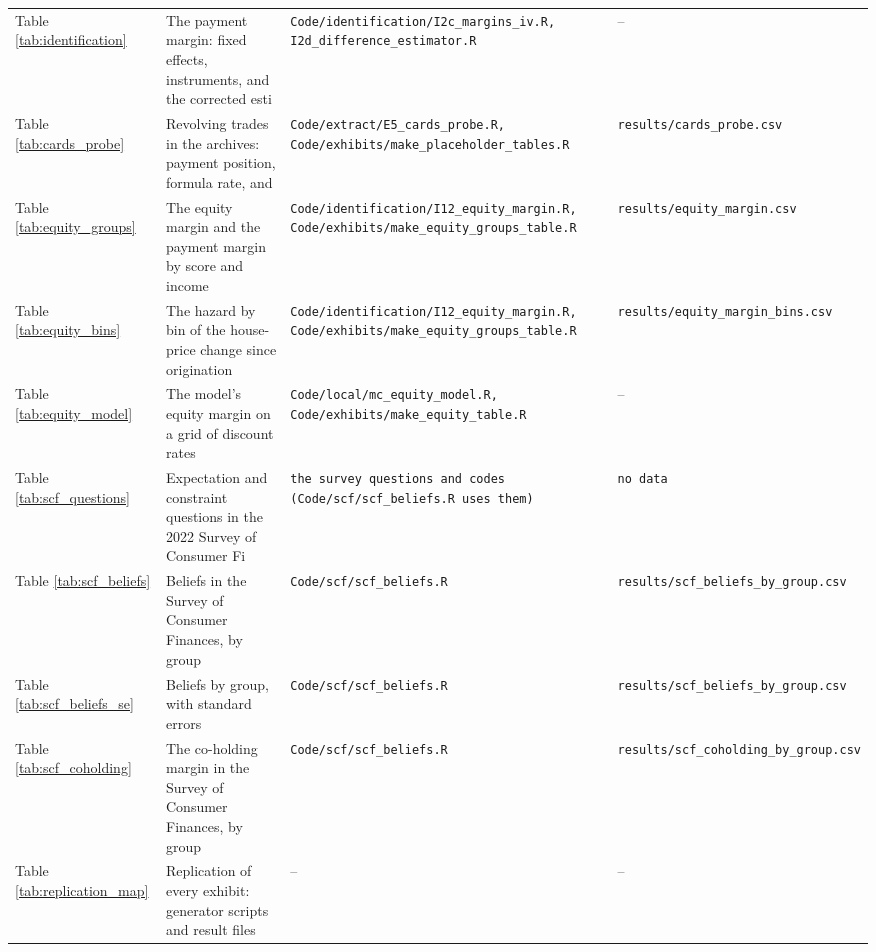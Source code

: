 \begin{longtable}{@{}p{}p{}p{}p{}@{}}
Table \ref{tab:identification} & The payment margin: fixed effects, instruments, and the corrected esti & \texttt{Code/identification/I2c\_margins\_iv.R, I2d\_difference\_estimator.R} & -- \\
Table \ref{tab:cards_probe} & Revolving trades in the archives: payment position, formula rate, and  & \texttt{Code/extract/E5\_cards\_probe.R, Code/exhibits/make\_placeholder\_tables.R} & \texttt{results/cards\_probe.csv} \\
Table \ref{tab:equity_groups} & The equity margin and the payment margin by score and income & \texttt{Code/identification/I12\_equity\_margin.R, Code/exhibits/make\_equity\_groups\_table.R} & \texttt{results/equity\_margin.csv} \\
Table \ref{tab:equity_bins} & The hazard by bin of the house-price change since origination & \texttt{Code/identification/I12\_equity\_margin.R, Code/exhibits/make\_equity\_groups\_table.R} & \texttt{results/equity\_margin\_bins.csv} \\
Table \ref{tab:equity_model} & The model's equity margin on a grid of discount rates & \texttt{Code/local/mc\_equity\_model.R, Code/exhibits/make\_equity\_table.R} & -- \\
Table \ref{tab:scf_questions} & Expectation and constraint questions in the 2022 Survey of Consumer Fi & \texttt{the survey questions and codes (Code/scf/scf\_beliefs.R uses them)} & \texttt{no data} \\
Table \ref{tab:scf_beliefs} & Beliefs in the Survey of Consumer Finances, by group & \texttt{Code/scf/scf\_beliefs.R} & \texttt{results/scf\_beliefs\_by\_group.csv} \\
Table \ref{tab:scf_beliefs_se} & Beliefs by group, with standard errors & \texttt{Code/scf/scf\_beliefs.R} & \texttt{results/scf\_beliefs\_by\_group.csv} \\
Table \ref{tab:scf_coholding} & The co-holding margin in the Survey of Consumer Finances, by group & \texttt{Code/scf/scf\_beliefs.R} & \texttt{results/scf\_coholding\_by\_group.csv} \\
Table \ref{tab:replication_map} & Replication of every exhibit: generator scripts and result files & -- & -- \\
\end{longtable}
